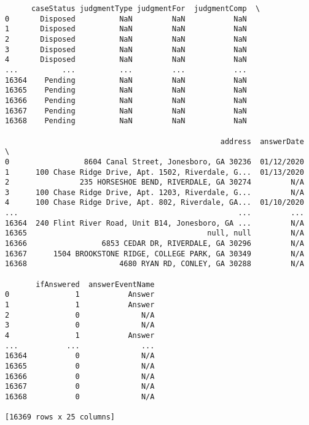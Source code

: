 \documentclass[11pt]{article}
\begin{document}
\begin{verbatim}
      caseStatus judgmentType judgmentFor  judgmentComp  \
0       Disposed          NaN         NaN           NaN   
1       Disposed          NaN         NaN           NaN   
2       Disposed          NaN         NaN           NaN   
3       Disposed          NaN         NaN           NaN   
4       Disposed          NaN         NaN           NaN   
...          ...          ...         ...           ...   
16364    Pending          NaN         NaN           NaN   
16365    Pending          NaN         NaN           NaN   
16366    Pending          NaN         NaN           NaN   
16367    Pending          NaN         NaN           NaN   
16368    Pending          NaN         NaN           NaN   

                                                 address  answerDate  \
0                 8604 Canal Street, Jonesboro, GA 30236  01/12/2020   
1      100 Chase Ridge Drive, Apt. 1502, Riverdale, G...  01/13/2020   
2                235 HORSESHOE BEND, RIVERDALE, GA 30274         N/A   
3      100 Chase Ridge Drive, Apt. 1203, Riverdale, G...         N/A   
4      100 Chase Ridge Drive, Apt. 802, Riverdale, GA...  01/10/2020   
...                                                  ...         ...   
16364  240 Flint River Road, Unit B14, Jonesboro, GA ...         N/A   
16365                                         null, null         N/A   
16366                 6853 CEDAR DR, RIVERDALE, GA 30296         N/A   
16367      1504 BROOKSTONE RIDGE, COLLEGE PARK, GA 30349         N/A   
16368                     4680 RYAN RD, CONLEY, GA 30288         N/A   

       ifAnswered  answerEventName  
0               1           Answer  
1               1           Answer  
2               0              N/A  
3               0              N/A  
4               1           Answer  
...           ...              ...  
16364           0              N/A  
16365           0              N/A  
16366           0              N/A  
16367           0              N/A  
16368           0              N/A  

[16369 rows x 25 columns]
    \end{verbatim}
\end{document}
